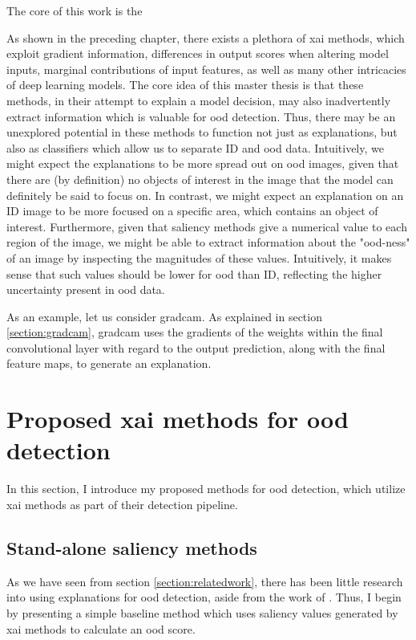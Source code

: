 \documentclass[UKenglish]{uiomasterthesis} %
\theoremstyle{definition}
\begin{document}
The core of this work is the 

As shown in the preceding chapter, there exists a plethora of \ac{xai} methods, which exploit gradient information, differences in output scores when altering model inputs, marginal contributions of input features, as well as many other intricacies of deep learning models. The core idea of this master thesis is that these methods, in their attempt to explain a model decision, may also inadvertently extract information which is valuable for \ac{ood} detection. Thus, there may be an unexplored potential in these methods to function not just as explanations, but also as classifiers which allow us to separate ID and \ac{ood} data. Intuitively, we might expect the explanations to be more spread out on \ac{ood} images, given that there are (by definition) no objects of interest in the image that the model can definitely be said to focus on. In contrast, we might expect an explanation on an ID image to be more focused on a specific area, which contains an object of interest. Furthermore, given that saliency methods give a numerical value to each region of the image, we might be able to extract information about the "\ac{ood}-ness" of an image by inspecting the magnitudes of these values. Intuitively, it makes sense that such values should be lower for \ac{ood} than ID, reflecting the higher uncertainty present in \ac{ood} data.

As an example, let us consider \ac{gradcam}. As explained in section \ref{section:gradcam}, \ac{gradcam} uses the gradients of the weights within the final convolutional layer with regard to the output prediction, along with the final feature maps, to generate an explanation.

\section{Proposed \ac{xai} methods for \ac{ood} detection}

In this section, I introduce my proposed methods for \ac{ood} detection, which utilize \ac{xai} methods as part of their detection pipeline.

\subsection{Stand-alone saliency methods}

As we have seen from section \ref{section:relatedwork}, there has been little research into using explanations for \ac{ood} detection, aside from the work of \cite{martinez}. Thus, I begin by presenting a simple baseline method which uses saliency values generated by \ac{xai} methods to calculate an \ac{ood} score.
\end{document}
